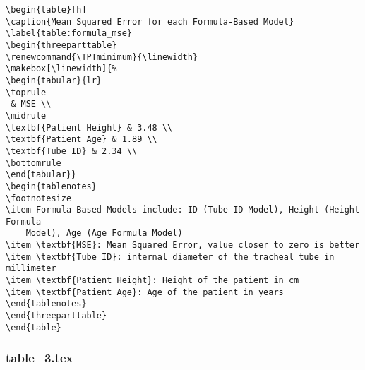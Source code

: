 \documentclass[11pt]{article}
\begin{document}
\begin{Verbatim}[tabsize=4]
\begin{table}[h]
\caption{Mean Squared Error for each Formula-Based Model}
\label{table:formula_mse}
\begin{threeparttable}
\renewcommand{\TPTminimum}{\linewidth}
\makebox[\linewidth]{%
\begin{tabular}{lr}
\toprule
 & MSE \\
\midrule
\textbf{Patient Height} & 3.48 \\
\textbf{Patient Age} & 1.89 \\
\textbf{Tube ID} & 2.34 \\
\bottomrule
\end{tabular}}
\begin{tablenotes}
\footnotesize
\item Formula-Based Models include: ID (Tube ID Model), Height (Height Formula
	Model), Age (Age Formula Model)
\item \textbf{MSE}: Mean Squared Error, value closer to zero is better
\item \textbf{Tube ID}: internal diameter of the tracheal tube in millimeter
\item \textbf{Patient Height}: Height of the patient in cm
\item \textbf{Patient Age}: Age of the patient in years
\end{tablenotes}
\end{threeparttable}
\end{table}

\end{Verbatim}

\subsubsection*{table\_3.tex}
\end{document}
